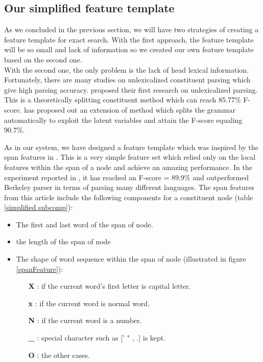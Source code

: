 \subsection{Our simplified feature template}
As we concluded in the previous section, we will have two strategies of creating a feature template for exact search. With the first approach, the feature template will be so small and lack of information so we created our own feature template based on the second one. \\
\indent With the second one, the only problem is the lack of head lexical information. Fortunately, there are many studies on unlexicalized constituent parsing which give high parsing accuracy. \cite{2003DanACL} proposed their first research on unlexicalized parsing. This is a theoretically splitting constituent method which can reach 85.77\% F-score. \cite{2007petrov} has proposed out an extension of \cite{2003DanACL} method which splits the grammar automatically to exploit the latent variables and attain the F-score equaling 90.7\%.

As in our system, we have designed a feature template which was inspired by the span features in \cite{2014David}. This is a very simple feature set which relied only on the local features within the span of a node and achieve an amazing performance. In the experiment reported in \cite{2014David}, it  has reached an F-score = 89.9\% and outperformed Berkeley parser in terms of parsing many different languages. The span features from this article include the following components for a constituent node (table \ref{simplified subcomp}):
\begin{itemize}
	\item The first and last word of the span of node.
	\item the length of the span of node
	\item The shape of word sequence within the span of node (illustrated in figure \ref{spanFeature}):
	\begin{itemize}
		\item[\textbf{X}]: if the current word's first letter is capital letter.
		\item[\textbf{x}]: if the current word is normal word.
		\item[\textbf{N}]: if the current word is a number.
		\item[\textbf{\_}]: special character such as [' " , .] is kept.
		\item[\textbf{O}]: the other cases.
	\end{itemize}
\end{itemize}

